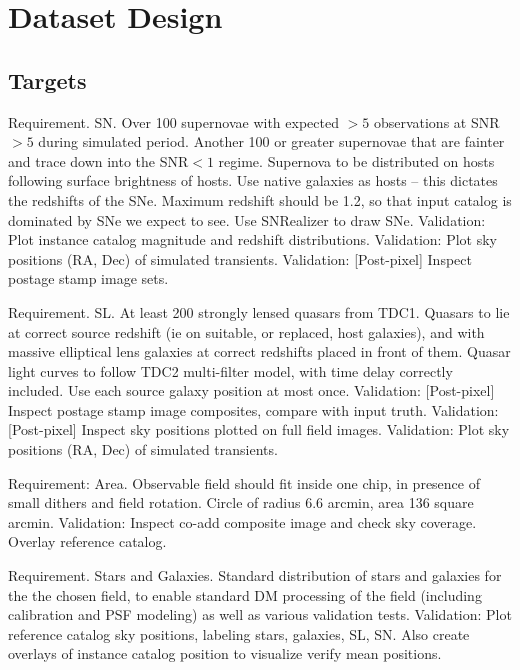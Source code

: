 \section{Dataset Design}
\label{sec:twinkles1:design}




\subsection{Targets}

Requirement. SN. 
Over 100 supernovae with expected $>5$ observations at SNR$>5$ during simulated period.
Another 100 or greater supernovae that are fainter and trace down into the SNR$<1$ regime.
Supernova to be distributed on hosts following surface brightness of hosts. Use native \CatSim
galaxies as hosts -- this dictates the redshifts of the SNe. Maximum redshift should be 1.2, so that input catalog is dominated by SNe we expect to see. Use SNRealizer to draw SNe.
Validation: Plot instance catalog magnitude and redshift distributions.
Validation: Plot sky positions (RA, Dec) of simulated transients.
Validation: [Post-pixel] Inspect postage stamp image sets. 

Requirement. SL.
At least 200 strongly lensed quasars from TDC1. Quasars to lie at correct source redshift (ie on suitable, or replaced, \CatSim host galaxies), and with massive elliptical 
lens galaxies at correct redshifts placed in front of them. Quasar light curves to follow TDC2 multi-filter model, with time delay correctly included. Use each source galaxy position at most once. 
Validation: [Post-pixel] Inspect postage stamp image composites, compare with input truth.
Validation: [Post-pixel] Inspect sky positions plotted on full field images. 
Validation: Plot sky positions (RA, Dec) of simulated transients.

Requirement: Area. 
Observable field should fit inside one chip, in presence of small dithers and field rotation. Circle of radius 6.6 arcmin, area 136 square arcmin. 
Validation: Inspect co-add composite image and check sky coverage. Overlay \CatSim reference catalog. 

Requirement. Stars and Galaxies.
Standard \CatSim distribution of stars and galaxies for the the chosen field, to enable standard DM processing of the field (including calibration and PSF modeling) as well as various validation tests. 
Validation: Plot \CatSim reference catalog sky positions, labeling stars, galaxies, SL, SN.   Also create overlays of instance catalog position to visualize verify mean positions.

